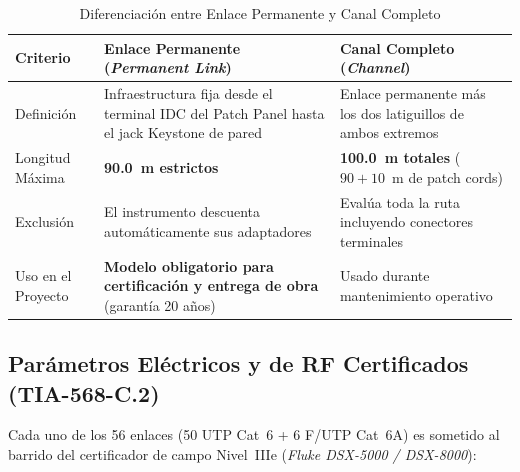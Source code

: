 \begin{table}[H]
\caption{Diferenciación entre Enlace Permanente y Canal Completo}
\begin{tabularx}{\textwidth}{@{}lXX@{}}
\toprule
\textbf{Criterio} & \textbf{Enlace Permanente (\textit{Permanent Link})} & \textbf{Canal Completo (\textit{Channel})} \\
\midrule
Definición        & Infraestructura fija desde el terminal IDC del Patch Panel hasta el jack Keystone de pared & Enlace permanente más los dos latiguillos de ambos extremos \\
Longitud Máxima   & \textbf{90.0~m estrictos} & \textbf{100.0~m totales} ($90 + 10$~m de patch cords) \\
Exclusión         & El instrumento descuenta automáticamente sus adaptadores & Evalúa toda la ruta incluyendo conectores terminales \\
Uso en el Proyecto & \textbf{Modelo obligatorio para certificación y entrega de obra} (garantía 20 años) & Usado durante mantenimiento operativo \\
\bottomrule
\end{tabularx}
\label{tab:permanentlink}
\end{table}

\subsection{Parámetros Eléctricos y de RF Certificados (TIA-568-C.2)}

Cada uno de los 56 enlaces (50 UTP Cat~6 + 6 F/UTP Cat~6A) es sometido al barrido del certificador de campo Nivel~IIIe (\textit{Fluke DSX-5000 / DSX-8000}):


